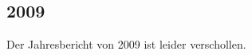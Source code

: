 \subsection*{2009}

\begin{history}
    Der Jahresbericht von 2009 ist leider verschollen.




\end{history}
